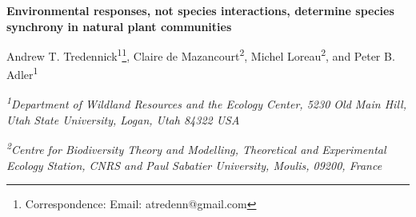 \documentclass[12pt,]{article}
\title{}
\author{}
\date{}
\let\rmarkdownfootnote\footnote%
\def\footnote{\protect\rmarkdownfootnote}
\begin{document}
\maketitle

\thispagestyle{fancy}
\begin{singlespace}

\begin{center}
\large{\textbf{Environmental responses, not species interactions, determine species synchrony in natural plant communities}}

\renewcommand*{\thefootnote}{\fnsymbol{footnote}}

\vspace{1em}

\normalsize{Andrew T. Tredennick\textsuperscript{1}\footnote{Correspondence: Email: atredenn@gmail.com}, Claire de Mazancourt\textsuperscript{2}, Michel Loreau\textsuperscript{2}, and Peter B. Adler\textsuperscript{1}}

\vspace{1em}

\textit{\small{\textsuperscript{1}Department of Wildland Resources and the Ecology Center, 5230 Old Main Hill, Utah State University, Logan, Utah 84322 USA}}

\textit{\small{\textsuperscript{2}Centre for Biodiversity Theory and Modelling, Theoretical and Experimental Ecology Station, CNRS and Paul Sabatier University, Moulis, 09200, France}}

\end{center}

\end{singlespace}\renewcommand*{\thefootnote}{\arabic{footnote}}

\setcounter{footnote}{0}

\begin{abstract}
Temporal asynchrony among species is an important mechanism through which diversity can stabilize ecosystem functioning, but identifying the mechanisms that determine synchrony remains a challenge.
Here, we refine and test theory showing that synchrony depends on three factors: species responses to environmental variation, interspecific competition, and demographic stochasticity. We then conduct simulation experiments with empirical population models to quantify the relative importance of these factors in five plant communities.
Simulation experiments showed that the average synchrony of per capita growth rates, which can range from 0 (perfect asynchrony) to 1 (perfect synchrony), was higher when environmental variation was present (0.62) rather than absent (0.43).
Removing interspecific competition and demographic stochasticity had small effects on synchrony. In these plant communities, where species interactions and demographic stochasticity have little influence, synchrony reflects the covariance in species responses to the environment.

\vspace{2em}

\noindent{}\textbf{Keywords}\\
\noindent{}synchrony, compensatory dynamics, environmental stochasticity, demographic stochasticity, interspecific competition, stability
\end{abstract}
\end{document}
